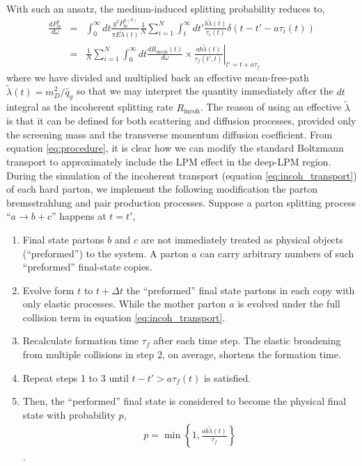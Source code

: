 \documentclass[aps, prc, reprint, amsmath, groupedaddress, nofootinbib]{revtex4-1}
\begin{document}
With such an ansatz, the medium-induced splitting probability reduces to,
\begin{eqnarray}
\nonumber
\frac{dP^{a}_{bc}}{d\omega} &=& \int_0^\infty dt \frac{g^2 P_{bc}^{a(0)}}{\pi E\tilde{\lambda}(t)} \frac{1}{N}\sum_{i=1}^N \int_t^\infty dt' \frac{b \tilde{\lambda}(t)}{\tau_i(t)} \delta(t-t'- a \tau_i(t)) \\
&=& \frac{1}{N}\sum_{i=1}^N\int_0^\infty dt \frac{dR_{\textrm{incoh}}(t)}{d\omega} \times \left.\frac{ab\tilde{\lambda}(t)}{\tau_f(t',t)}\right|_{t'=t+a\tau_f}
\label{eq:procedure}
\end{eqnarray}
where we have divided and multiplied back an effective mean-free-path $\tilde{\lambda}(t) = m_D^2/\hat{q}_g$ so that we may interpret the quantity immediately after the $dt$ integral as the incoherent splitting rate $R_{\textrm{incoh}}$.
The reason of using an effective $\tilde{\lambda}$ is that it can be defined for both scattering and diffusion processes, provided only the screening mass and the transverse momentum diffusion coefficient.
From equation \ref{eq:procedure}, it is clear how we can modify the standard Boltzmann transport to approximately include the LPM effect in the deep-LPM region.
During the simulation of the incoherent transport  (equation \ref{eq:incoh_transport}) of each hard parton, we implement the following modification the parton bremsstrahlung and pair production processes.
Suppose a parton splitting process ``$a\rightarrow b+c$'' happens at $t=t'$,
\begin{enumerate}
\item Final state partons $b$ and $c$ are not immediately treated as physical objects (``preformed'') to the system. A parton $a$ can carry arbitrary numbers of such ``preformed'' final-state copies.
\item Evolve form $t$ to $t+\Delta t$ the ``preformed'' final state partons in each copy with only elastic processes. 
While the mother parton $a$ is evolved under the full collision term in equation \ref{eq:incoh_transport}.
\item Recalculate formation time $\tau_f$ after each time step. 
The elastic broadening from multiple collisions in step 2, on average, shortens the formation time.
\item Repeat steps 1 to 3 until $t-t' > a\tau_f(t)$ is satisfied. 
\item Then, the ``performed'' final state is considered to become the physical final state with probability $p$, 
\begin{eqnarray}
p = \min\left\{1, \frac{ab\tilde{\lambda}(t)}{\tau_f}\right\}
\label{eq:rejection}
\end{eqnarray}.
\end{enumerate}
\end{document}
